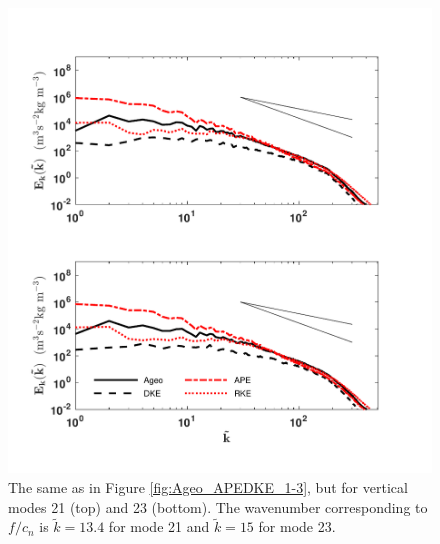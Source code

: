 \begin{figure}[H]
\includegraphics[scale=1]{Chapter4/img/Ageo_APEDKE_21-23}
\caption{The same as in Figure \ref{fig:Ageo_APEDKE_1-3}, but for vertical modes 21 (top) and 23 (bottom). The wavenumber corresponding to $f/c_n$ is $\tilde{k} = 13.4$ for mode 21 and $\tilde{k} = 15$ for mode 23.}
\label{fig:Ageo_APEDKE_21-23}
\end{figure}


